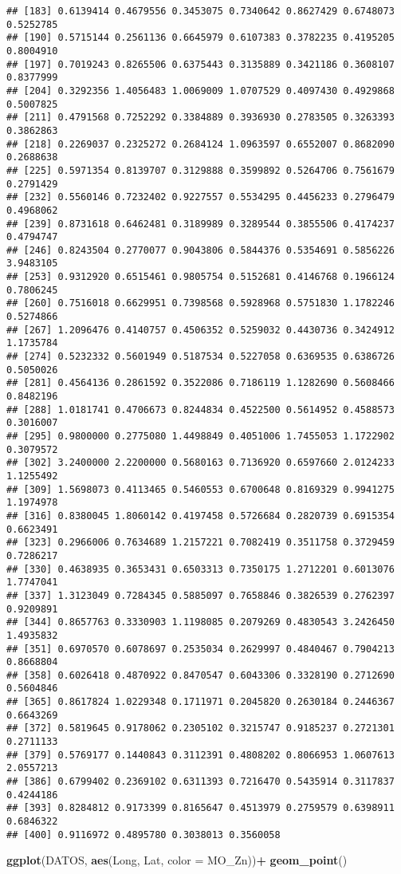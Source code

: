 \documentclass[
]{article}
\newenvironment{Shaded}{\begin{snugshade}}{\end{snugshade}}
\newcommand{\DataTypeTok}[1]{\textcolor[rgb]{0.13,0.29,0.53}{#1}}
\newcommand{\KeywordTok}[1]{\textcolor[rgb]{0.13,0.29,0.53}{\textbf{#1}}}
\newcommand{\NormalTok}[1]{#1}
\newcommand{\OperatorTok}[1]{\textcolor[rgb]{0.81,0.36,0.00}{\textbf{#1}}}
\newcommand{\StringTok}[1]{\textcolor[rgb]{0.31,0.60,0.02}{#1}}
\begin{document}
\begin{verbatim}
## [183] 0.6139414 0.4679556 0.3453075 0.7340642 0.8627429 0.6748073 0.5252785
## [190] 0.5715144 0.2561136 0.6645979 0.6107383 0.3782235 0.4195205 0.8004910
## [197] 0.7019243 0.8265506 0.6375443 0.3135889 0.3421186 0.3608107 0.8377999
## [204] 0.3292356 1.4056483 1.0069009 1.0707529 0.4097430 0.4929868 0.5007825
## [211] 0.4791568 0.7252292 0.3384889 0.3936930 0.2783505 0.3263393 0.3862863
## [218] 0.2269037 0.2325272 0.2684124 1.0963597 0.6552007 0.8682090 0.2688638
## [225] 0.5971354 0.8139707 0.3129888 0.3599892 0.5264706 0.7561679 0.2791429
## [232] 0.5560146 0.7232402 0.9227557 0.5534295 0.4456233 0.2796479 0.4968062
## [239] 0.8731618 0.6462481 0.3189989 0.3289544 0.3855506 0.4174237 0.4794747
## [246] 0.8243504 0.2770077 0.9043806 0.5844376 0.5354691 0.5856226 3.9483105
## [253] 0.9312920 0.6515461 0.9805754 0.5152681 0.4146768 0.1966124 0.7806245
## [260] 0.7516018 0.6629951 0.7398568 0.5928968 0.5751830 1.1782246 0.5274866
## [267] 1.2096476 0.4140757 0.4506352 0.5259032 0.4430736 0.3424912 1.1735784
## [274] 0.5232332 0.5601949 0.5187534 0.5227058 0.6369535 0.6386726 0.5050026
## [281] 0.4564136 0.2861592 0.3522086 0.7186119 1.1282690 0.5608466 0.8482196
## [288] 1.0181741 0.4706673 0.8244834 0.4522500 0.5614952 0.4588573 0.3016007
## [295] 0.9800000 0.2775080 1.4498849 0.4051006 1.7455053 1.1722902 0.3079572
## [302] 3.2400000 2.2200000 0.5680163 0.7136920 0.6597660 2.0124233 1.1255492
## [309] 1.5698073 0.4113465 0.5460553 0.6700648 0.8169329 0.9941275 1.1974978
## [316] 0.8380045 1.8060142 0.4197458 0.5726684 0.2820739 0.6915354 0.6623491
## [323] 0.2966006 0.7634689 1.2157221 0.7082419 0.3511758 0.3729459 0.7286217
## [330] 0.4638935 0.3653431 0.6503313 0.7350175 1.2712201 0.6013076 1.7747041
## [337] 1.3123049 0.7284345 0.5885097 0.7658846 0.3826539 0.2762397 0.9209891
## [344] 0.8657763 0.3330903 1.1198085 0.2079269 0.4830543 3.2426450 1.4935832
## [351] 0.6970570 0.6078697 0.2535034 0.2629997 0.4840467 0.7904213 0.8668804
## [358] 0.6026418 0.4870922 0.8470547 0.6043306 0.3328190 0.2712690 0.5604846
## [365] 0.8617824 1.0229348 0.1711971 0.2045820 0.2630184 0.2446367 0.6643269
## [372] 0.5819645 0.9178062 0.2305102 0.3215747 0.9185237 0.2721301 0.2711133
## [379] 0.5769177 0.1440843 0.3112391 0.4808202 0.8066953 1.0607613 2.0557213
## [386] 0.6799402 0.2369102 0.6311393 0.7216470 0.5435914 0.3117837 0.4244186
## [393] 0.8284812 0.9173399 0.8165647 0.4513979 0.2759579 0.6398911 0.6846322
## [400] 0.9116972 0.4895780 0.3038013 0.3560058
\end{verbatim}

\begin{Shaded}
\begin{Highlighting}[]
\KeywordTok{ggplot}\NormalTok{(DATOS, }\KeywordTok{aes}\NormalTok{(Long, Lat, }\DataTypeTok{color =}\NormalTok{ MO_Zn))}\OperatorTok{+}
\StringTok{  }\KeywordTok{geom_point}\NormalTok{()}
\end{Highlighting}
\end{Shaded}
\end{document}
